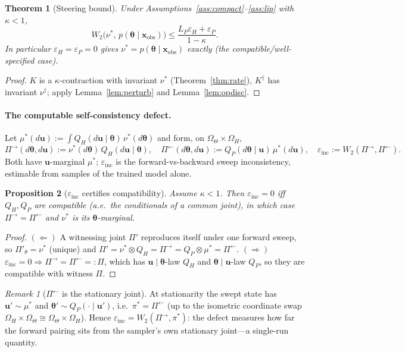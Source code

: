 \documentclass[11pt]{article}
\theoremstyle{plain}
\newtheorem{theorem}{Theorem}
\newtheorem{proposition}[theorem]{Proposition}
\theoremstyle{definition}
\theoremstyle{remark}
\newtheorem{remark}{Remark}
\newcommand{\Om}{\Omega}
\newcommand{\xobs}{\bm{x}_{\mathrm{obs}}}
\newcommand{\bth}{\bm{\theta}}
\newcommand{\bu}{\bm{u}}
\newcommand{\einc}{\varepsilon_{\mathrm{inc}}}
\begin{document}
\begin{theorem}[Steering bound]
\label{thm:B}
Under Assumptions~\ref{ass:compact}--\ref{ass:lip} with $\kappa<1$,
\[
  W_2\big(\nu^\ast,\,p(\bth\mid\xobs)\big)\le\frac{L_P\varepsilon_H+\varepsilon_P}{1-\kappa}.
\]
In particular $\varepsilon_H=\varepsilon_P=0$ gives $\nu^\ast=p(\bth\mid\xobs)$ exactly (the
compatible/well-specified case).
\end{theorem}
\begin{proof}
$K$ is a $\kappa$-contraction with invariant $\nu^\ast$ (Theorem~\ref{thm:rate}), $K^\dagger$ has
invariant $\nu^\dagger$; apply Lemma~\ref{lem:perturb} and Lemma~\ref{lem:opdisc}.
\end{proof}

\paragraph{The computable self-consistency defect.} Let
$\mu^\ast(d\bu):=\int Q_H(d\bu\mid\bth)\,\nu^\ast(d\bth)$ and form, on $\Om_\Theta\times\Om_H$,
\begin{equation}\label{eq:einc}
  \Pi^{\rightarrow}(d\bth,d\bu):=\nu^\ast(d\bth)\,Q_H(d\bu\mid\bth),\quad
  \Pi^{\leftarrow}(d\bth,d\bu):=Q_P(d\bth\mid\bu)\,\mu^\ast(d\bu),\quad
  \einc:=W_2(\Pi^{\rightarrow},\Pi^{\leftarrow}).
\end{equation}
Both have $\bu$-marginal $\mu^\ast$; $\einc$ is the forward-vs-backward sweep inconsistency, estimable
from samples of the trained model alone.

\begin{proposition}[$\einc$ certifies compatibility]
\label{prop:inc}
Assume $\kappa<1$. Then $\einc=0$ iff $Q_H,Q_P$ are compatible (a.e.\ the conditionals of a common
joint), in which case $\Pi^\rightarrow=\Pi^\leftarrow$ and $\nu^\ast$ is its $\bth$-marginal.
\end{proposition}
\begin{proof}
$(\Leftarrow)$ A witnessing joint $\Pi'$ reproduces itself under one forward sweep, so
$\Pi'_\theta=\nu^\ast$ (unique) and $\Pi'=\nu^\ast\otimes Q_H=\Pi^\rightarrow=Q_P\otimes\mu^\ast=\Pi^\leftarrow$.
$(\Rightarrow)$ $\einc=0\Rightarrow\Pi^\rightarrow=\Pi^\leftarrow=:\Pi$, which has $\bu\mid\bth$-law
$Q_H$ and $\bth\mid\bu$-law $Q_P$, so they are compatible with witness $\Pi$.
\end{proof}

\begin{remark}[$\Pi^\leftarrow$ is the stationary joint]
\label{rem:pileft}
At stationarity the swept state has $\bu'\sim\mu^\ast$ and $\bth'\sim Q_P(\cdot\mid\bu')$, i.e.\
$\pi^\ast=\Pi^\leftarrow$ (up to the isometric coordinate swap
$\Om_H\times\Om_\Theta\cong\Om_\Theta\times\Om_H$). Hence $\einc=W_2(\Pi^\rightarrow,\pi^\ast)$: the
defect measures how far the forward pairing sits from the sampler's own stationary joint---a single-run
quantity.
\end{remark}
\end{document}
